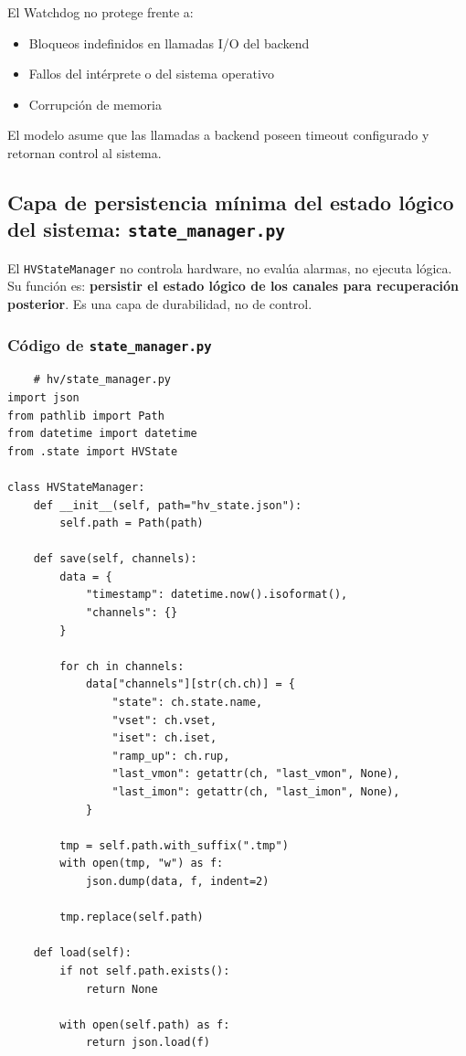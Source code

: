 \documentclass{article}
\begin{document}
El Watchdog no protege frente a:

\begin{itemize}
    \item Bloqueos indefinidos en llamadas I/O del backend
    \item Fallos del intérprete o del sistema operativo
    \item Corrupción de memoria
\end{itemize}

El modelo asume que las llamadas a backend poseen timeout
configurado y retornan control al sistema.


\subsection{Capa de persistencia mínima del estado lógico del sistema: \texttt{state\_manager.py}}

El \texttt{HVStateManager} no controla hardware, no evalúa alarmas, no ejecuta lógica. Su función es:
\textbf{persistir el estado lógico de los canales para recuperación posterior}. Es una capa de durabilidad, no de control.\\

\subsubsection{Código de \texttt{state\_manager.py}}

\begin{lstlisting}
    # hv/state_manager.py
import json
from pathlib import Path
from datetime import datetime
from .state import HVState

class HVStateManager:
    def __init__(self, path="hv_state.json"):
        self.path = Path(path)

    def save(self, channels):
        data = {
            "timestamp": datetime.now().isoformat(),
            "channels": {}
        }

        for ch in channels:
            data["channels"][str(ch.ch)] = {
                "state": ch.state.name,
                "vset": ch.vset,
                "iset": ch.iset,
                "ramp_up": ch.rup,
                "last_vmon": getattr(ch, "last_vmon", None),
                "last_imon": getattr(ch, "last_imon", None),
            }

        tmp = self.path.with_suffix(".tmp")
        with open(tmp, "w") as f:
            json.dump(data, f, indent=2)

        tmp.replace(self.path)

    def load(self):
        if not self.path.exists():
            return None

        with open(self.path) as f:
            return json.load(f)
\end{lstlisting}
\end{document}
